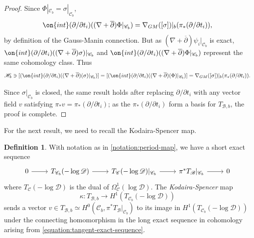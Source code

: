 \documentclass[12 pt]{amsart}
\theoremstyle{plain}
\theoremstyle{definition}
\newtheorem{definition}[subsubsection]{Definition}
\theoremstyle{remark}
\numberwithin{equation}{section}
\begin{document}
\begin{proof}
	Since $\Phi|_{\mathscr C_b} = \sigma|_{\mathscr C_b}$, 
	$$\on{int}(\partial/\partial
	t_i)((\nabla+\overline{\partial})\Phi|_{\mathscr{C}_b}) =
	\nabla_{GM}([\sigma])|_b(\pi_*(\partial/\partial t_i)),$$ by definition of the Gauss-Manin connection.	
	But as $(\nabla+\overline{\partial})
		\psi_i|_{\mathscr{C}_b}$ is exact, 
		$\on{int}(\partial/\partial t_i) ((\nabla+\overline{\partial})\sigma)|_{\mathscr{C}_b}$ and $\on{int}(\partial/\partial t_i)((\nabla+\overline{\partial})\Phi|_{\mathscr{C}_b})$ represent the same cohomology class. Thus 
\begin{align*}
	\mathscr{H}_b \ni [(\on{int}(\partial/\partial t_i)((\nabla+\overline{\partial})(\sigma)|_{\mathscr C_b})] =
		[(\on{int}(\partial/\partial t_i)((\nabla+\overline{\partial})(\Phi)|_{\mathscr C_b})] =
		\nabla_{GM}([\sigma])|_b(\pi_*(\partial/\partial t_i)).
\end{align*}

 Since
	$\sigma|_{\mathscr{C}_b}$ is closed, 
	the same result holds after
	replacing $\partial/\partial t_i$ with any vector field $v$ satisfying
	$\pi_*v=\pi_*(\partial/\partial t_i)$; 	
	as the $\pi_*(\partial/\partial t_i)$ form a
	basis for $T_{\mathscr{B},b}$, the proof is complete.
		\end{proof}

For the next result, we need to recall the Kodaira-Spencer map.
\begin{definition}
	\label{definition:kodaira-spencer}
	With notation as in \autoref{notation:period-map},
we have a short exact sequence
\begin{equation}
	\label{equation:tangent-exact-sequence}
	\begin{tikzcd}
		0 \ar {r} & T_{\mathscr C_b}(-\log \mathscr D) \ar {r} & T_{\mathscr C}(-
		\log \mathscr D)|_{\mathscr C_b} \ar {r}
	& \pi^* T_{\mathscr B}|_{\mathscr C_b} \ar {r} & 0 
\end{tikzcd}\end{equation}
where $T_{\mathscr{C}}(-\log\mathscr{D})$ is the dual of $\Omega^1_{\mathscr{C}}(\log \mathscr{D})$.
The {\em Kodaira-Spencer} map $$\kappa: T_{\mathscr{B}, b}\to H^1(T_{\mathscr{C}_b}(-\log\mathscr{D}))$$ sends 
a vector $v \in T_{\mathscr B,b} \simeq H^0(\mathscr C_b, \pi^* T_{\mathscr B}|_{\mathscr C_b})$ to its image in 
$H^1(T_{\mathscr{C}_b}(-\log\mathscr{D}))$ under the connecting homomorphism in the long exact sequence in cohomology arising from \eqref{equation:tangent-exact-sequence}. 
\end{definition}
\end{document}

